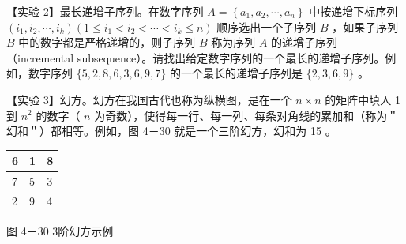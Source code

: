 \documentclass[10pt]{article}
\begin{document}
【实验 2】最长递增子序列。在数字序列 $A=\left\{a_{1}, a_{2}, \cdots, a_{n}\right\}$ 中按递增下标序列 $\left(i_{1}, i_{2}, \cdots, i_{k}\right)\left(1 \leqslant i_{1}<i_{2}<\cdots<i_{k} \leqslant n\right)$ 顺序选出一个子序列 $B$ ，如果子序列 $B$ 中的数字都是严格递增的，则子序列 $B$ 称为序列 $A$ 的递增子序列（incremental subsequence）。请找出给定数字序列的一个最长的递增子序列。例如，数字序列 $\{5,2,8,6,3,6,9,7\}$ 的一个最长的递增子序列是 $\{2,3,6,9\}$ 。

【实验 3】幻方。幻方在我国古代也称为纵横图，是在一个 $n \times n$ 的矩阵中填人 1 到 $n^{2}$ 的数字（ $n$ 为奇数），使得每一行、每一列、每条对角线的累加和（称为＂幻和＂）都相等。例如，图 4－30 就是一个三阶幻方，幻和为 15 。

\begin{center}
\begin{tabular}{|l|l|l|}
\hline
6 & 1 & 8 \\
\hline
7 & 5 & 3 \\
\hline
2 & 9 & 4 \\
\hline
\end{tabular}
\end{center}

图 4－30 3阶幻方示例
\end{document}
